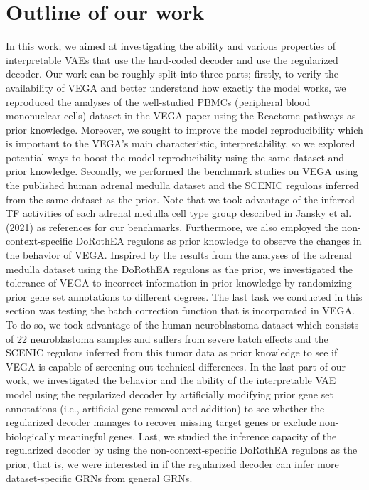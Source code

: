 \section{Outline of our work}
In this work, we aimed at investigating the ability and various properties of interpretable VAEs that use the hard-coded decoder\cite{Seninge2021} and use the regularized decoder\cite{Rybakov2020}. Our work can be roughly split into three parts; firstly, to verify the availability of VEGA and better understand how exactly the model works, we reproduced the analyses of the well-studied PBMCs (peripheral blood mononuclear cells) dataset\cite{Kang2018} in the VEGA paper\cite{Seninge2021} using the Reactome pathways\cite{Jassal2020} as prior knowledge. Moreover, we sought to improve the model reproducibility which is important to the VEGA's main characteristic, interpretability, so we explored potential ways to boost the model reproducibility using the same dataset and prior knowledge. Secondly, we performed the benchmark studies on VEGA using the published human adrenal medulla dataset\cite{Jansky2021} and the SCENIC regulons\cite{Jansky2021} inferred from the same dataset as the prior. Note that we took advantage of the inferred TF activities of each adrenal medulla cell type group described in Jansky et al. (2021) as references for our benchmarks. Furthermore, we also employed the non-context-specific DoRothEA regulons\cite{Garcia-Alonso2019} as prior knowledge to observe the changes in the behavior of VEGA. Inspired by the results from the analyses of the adrenal medulla dataset\cite{Jansky2021} using the DoRothEA regulons as the prior, we investigated the tolerance of VEGA to incorrect information in prior knowledge by randomizing prior gene set annotations to different degrees. The last task we conducted in this section was testing the batch correction function\cite{Lopez2018} that is incorporated in VEGA. To do so, we took advantage of the human neuroblastoma dataset\cite{Jansky2021} which consists of 22 neuroblastoma samples and suffers from severe batch effects and the SCENIC regulons inferred from this tumor data as prior knowledge to see if VEGA is capable of screening out technical differences. In the last part of our work, we investigated the behavior and the ability of the interpretable VAE model using the regularized decoder by artificially modifying prior gene set annotations (i.e., artificial gene removal and addition) to see whether the regularized decoder manages to recover missing target genes or exclude non-biologically meaningful genes. Last, we studied the inference capacity of the regularized decoder by using the non-context-specific DoRothEA regulons as the prior, that is, we were interested in if the regularized decoder can infer more dataset-specific GRNs from general GRNs.
